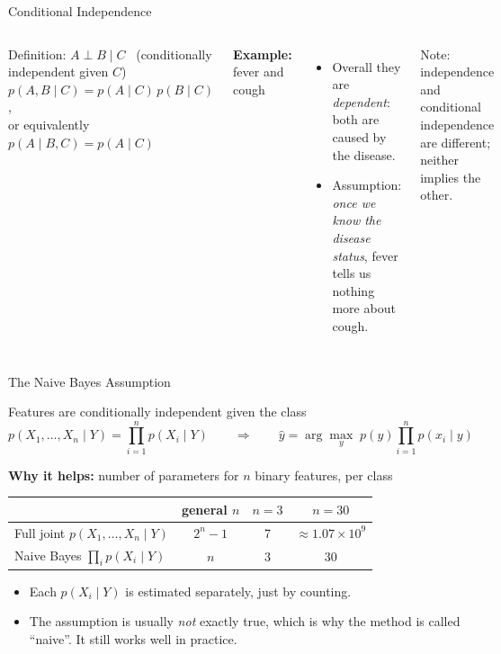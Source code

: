 \documentclass[aspectratio=169]{beamer}
\begin{document}
\begin{frame}{Conditional Independence}
\begin{columns}[c]
\begin{block}{Definition: $A \perp B \mid C$ \ (conditionally independent given $C$)}
$p(A,B\mid C) = p(A\mid C)\,p(B\mid C)$,\\[2pt]
or equivalently \ $p(A\mid B,C) = p(A\mid C)$
\end{block}
\textbf{Example:} fever and cough
\begin{itemize}
  \item Overall they are \emph{dependent}: both are caused by the disease.
  \item Assumption: \emph{once we know the disease status}, fever tells us nothing more about cough.
\end{itemize}
Note: independence and conditional independence are different; neither implies the other.
\centering
{}
\end{columns}
\end{frame}

\begin{frame}{The Naive Bayes Assumption}
\begin{block}{Features are conditionally independent given the class}
\[
  p(X_1,\dots,X_n\mid Y)=\prod_{i=1}^n p(X_i\mid Y)
  \qquad\Rightarrow\qquad
  \hat y = \arg\max_y\; p(y)\prod_{i=1}^n p(x_i\mid y)
\]
\end{block}
\textbf{Why it helps:} number of parameters for $n$ binary features, per class
\begin{center}
\begin{tabular}{lccc}
\toprule
 & general $n$ & $n=3$ & $n=30$ \\
\midrule
Full joint $p(X_1,\dots,X_n\mid Y)$ & $2^n-1$ & 7 & $\approx 1.07\times 10^{9}$ \\
Naive Bayes $\prod_i p(X_i\mid Y)$  & $n$     & 3 & 30 \\
\bottomrule
\end{tabular}
\end{center}
\begin{itemize}
  \item Each $p(X_i\mid Y)$ is estimated separately, just by counting.
  \item The assumption is usually \emph{not} exactly true, which is why the method is called ``naive''. It still works well in practice.
\end{itemize}
\end{frame}
\end{document}
